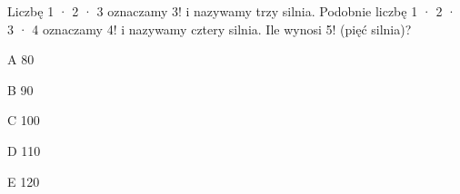 \begin{tresc}
Liczbę 1 · 2 · 3 oznaczamy 3! i nazywamy trzy silnia. Podobnie liczbę 1 · 2 · 3 · 4 oznaczamy 4! i nazywamy cztery silnia. Ile wynosi 5! (pięć silnia)?
\end{tresc}
\begin{wariant}{A} 80 \end{wariant}
\begin{wariant}{B} 90 \end{wariant}
\begin{wariant}{C} 100 \end{wariant}
\begin{wariant}{D} 110 \end{wariant}
\begin{wariant}{E} 120 \end{wariant}
